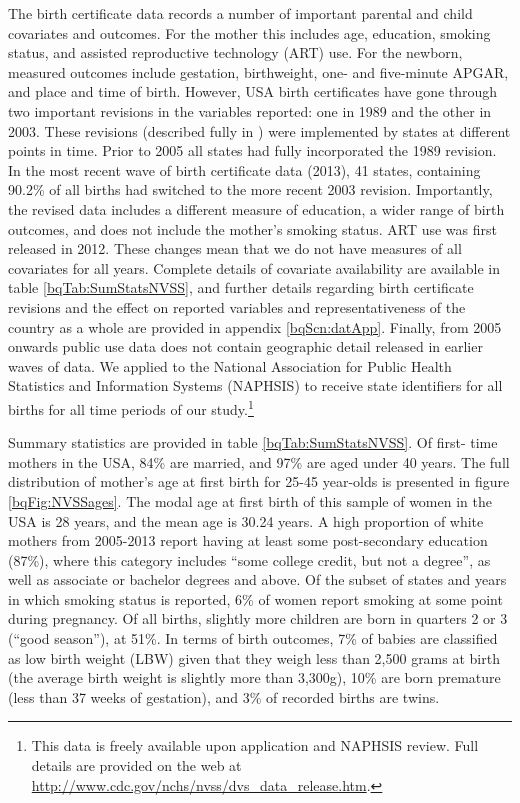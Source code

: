 \documentclass[a4paper, 11 pt]{article}
\theoremstyle{plain}
\begin{document}
\begin{spacing}{1.4}
The birth certificate data records a number of important parental and child
covariates and outcomes.  For the mother this includes age, education, smoking
status, and assisted reproductive technology (ART) use. For the newborn, 
measured outcomes include gestation, birthweight, one- and five-minute APGAR, 
and place and time of birth. However, USA birth certificates have gone through 
two important revisions in the variables reported: one in 1989 and the other in 
2003.  These revisions (described fully in \citet{NCHS2000}) were implemented
by states at different points in time.  Prior to 2005 all states had fully 
incorporated the 1989 revision.  In the most recent wave of birth certificate
data (2013), 41 states, containing 90.2\% of all births had switched to the
more recent 2003 revision.  Importantly, the revised data includes a different
measure of education, a wider range of birth outcomes, and does not include
the mother's smoking status. ART use was first released in 2012. These changes
mean that we do not have measures of all covariates for all years.  Complete
details of covariate availability are available in table 
\ref{bqTab:SumStatsNVSS}, and further details regarding birth certificate 
revisions and the effect on reported variables and representativeness of the
country as a whole are provided in appendix \ref{bqScn:datApp}. Finally, from 2005 
onwards public use data does not contain geographic detail released in earlier 
waves of data.  We applied to the National Association for Public Health 
Statistics and Information Systems (NAPHSIS) to receive state identifiers for all 
births for all time periods of our study.\footnote{This data is freely available 
upon application and NAPHSIS review. Full details are provided on the web at
\href{http://www.cdc.gov/nchs/nvss/dvs_data_release.htm}%
{http://www.cdc.gov/nchs/nvss/dvs\_data\_release.htm}.}

Summary statistics are provided in table \ref{bqTab:SumStatsNVSS}.  Of first-%
time mothers in the USA, 84\% are married, and 97\% are aged under 40 years.
The full distribution of mother's age at first birth for 25-45 year-olds is 
presented in figure \ref{bqFig:NVSSages}.  The modal age at first birth of this
sample of women in the USA is 28 years, and the mean age is 30.24 years. A high 
proportion of white mothers from 2005-2013 report having at least some 
post-secondary education (87\%), where this category includes ``some college 
credit, but not a degree'', as well as associate or bachelor degrees and above.  
Of the subset of states and years in which smoking status is reported, 6\% of 
women report smoking at some point during pregnancy.  Of all births, slightly 
more children are born in quarters 2 or 3 (``good season''), at 51\%.  In terms
of birth outcomes, 7\% of babies are classified as low birth weight (LBW) given
that they weigh less than 2,500 grams at birth (the average birth weight is 
slightly more than 3,300g), 10\% are born premature (less than 37 weeks of 
gestation), and 3\% of recorded births are twins.


\end{spacing}
\end{document}
